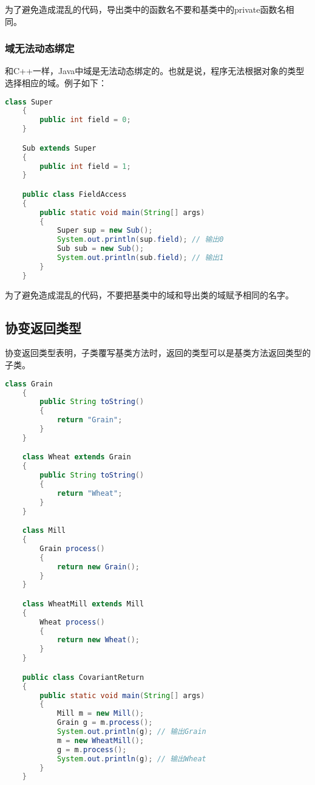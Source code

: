 \documentclass[a4paper,left=2.5cm,right=2.5cm,11pt]{article}
\begin{document}
	为了避免造成混乱的代码，导出类中的函数名不要和基类中的private函数名相同。

\subsubsection{域无法动态绑定}
	和C++一样，Java中域是无法动态绑定的。也就是说，程序无法根据对象的类型选择相应的域。例子如下：
	\begin{lstlisting}[language = Java]
	class Super
	{
		public int field = 0;
	}

	Sub extends Super
	{
		public int field = 1;
	}

	public class FieldAccess
	{
		public static void main(String[] args)
		{
			Super sup = new Sub();
			System.out.println(sup.field); // 输出0
			Sub sub = new Sub();
			System.out.println(sub.field); // 输出1
		}
	}
	\end{lstlisting}

	为了避免造成混乱的代码，不要把基类中的域和导出类的域赋予相同的名字。

\subsection{协变返回类型}
	协变返回类型表明，子类覆写基类方法时，返回的类型可以是基类方法返回类型的子类。

	\begin{lstlisting}[language = Java]
	class Grain
	{
		public String toString()
		{
			return "Grain";
		}
	}

	class Wheat extends Grain
	{
		public String toString()
		{
			return "Wheat";
		}
	}

	class Mill
	{
		Grain process()
		{
			return new Grain();
		}
	}

	class WheatMill extends Mill
	{
		Wheat process()
		{
			return new Wheat();
		}
	}

	public class CovariantReturn
	{
		public static void main(String[] args)
		{
			Mill m = new Mill();
			Grain g = m.process();
			System.out.println(g); // 输出Grain
			m = new WheatMill();
			g = m.process();
			System.out.println(g); // 输出Wheat
		}
	}
	\end{lstlisting}

	
\end{document}
